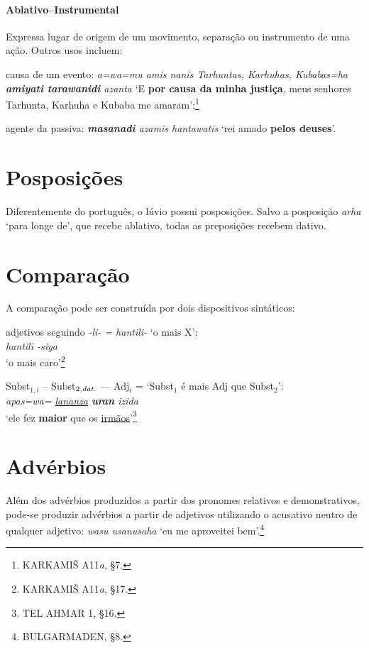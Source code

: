 \paragraph{Ablativo--Instrumental}
Expressa lugar de origem de um movimento, separação ou instrumento de uma ação.
Outros usos incluem:
\begin{inparaenum}[(a)]
	\item causa de um evento:
	\emph{a=wa=mu amis nanis Tarhuntas, Karhuhas, Kubabas=ha
		\textbf{amiyati tara\-wanidi} azanta}
	`E \textbf{por causa da minha justiça}, meus senhores Tarhunta, Kar\-huha e
	Kubaba me amaram';\footnote{KARKAMIŠ A11\emph{a}, §7.}
	\item agente da passiva: \emph{\textbf{masanadi} azamis hantawatis}
	`rei amado
	\textbf{pelos deuses}'.
\end{inparaenum}

\section{Posposições}
Diferentemente do português, o lúvio possui posposições.
Salvo a posposição \emph{arha} `para longe de', que recebe ablativo, todas as
preposições recebem dativo.

\clearpage
\section{Comparação}\label{sec:Comparacao}
A comparação pode ser construída por dois dispositivos sintáticos:
\begin{compactenum}[(a)]
	\item adjetivos seguindo \emph{-li- = hantili-} `o mais X':\\
	\emph{hantili -siya}\\ `o mais caro'\footnote{KARKAMIŠ
		A11\emph{a}, §17.}
	\item Subst$_{1,i}$ -- Subst$_{2,\emph{dat.}}$ --- Adj$_i$ = `Subst$_1$ é mais Adj que Subst$_2$':\\
	\emph{apas=wa= \uline{lananza} \textbf{uran}  izida}\\
	`ele  fez \textbf{maior} que os \uline{irmãos}'\footnote{TEL
		AHMAR 1, §16.}
\end{compactenum}


\section{Advérbios}
Além dos advérbios produzidos a partir dos pronomes relativos e demonstrativos,
pode-se produzir advérbios a partir de adjetivos utilizando o acusativo neutro
de qualquer adjetivo: \emph{wasu usanusaha} `eu me aproveitei
bem'.\footnote{BULGARMADEN, §8.}


